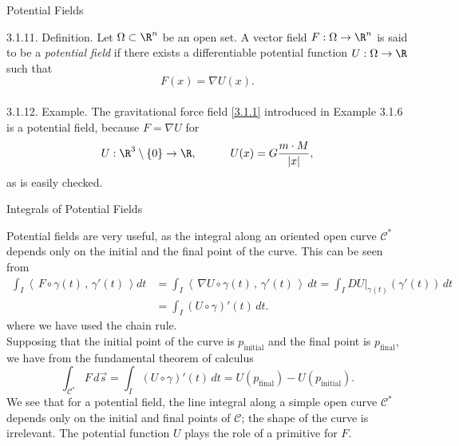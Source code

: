 \documentclass[smaller,hyperref={CJKbookmarks=true}]{beamer}
\newcommand{\scp}[2]{\left\langle\,#1\,,\,#2\,\right\rangle} \newcommand{\scpp}{\langle\,\cdot\,,\,\cdot\,\rangle}
\begin{document}
\begin{frame}[c]{Potential Fields}
\begin{spacing}{1.05}
\alert{3.1.11. Definition.} Let $\Omega\subset\R^n$ be an open set. A vector field $F:\Omega\to\R^n$ is said to be a \emph{potential field} if there exists a dif{}ferentiable potential
function $U:\Omega\to\R$ such that
\[F(x)=\nabla U(x).\]
 \\[12pt]
\alert{3.1.12. Example.} The gravitational force field \eqref{3.1.1} introduced in Example 3.1.6 is a potential field, because $F=\nabla U$ for
\begin{equation}\label{3.1.7}
  U:\R^3\setminus\{0\}\to\R,\qquad\quad
  U(x)=G\frac{m\cdot M}{|x|},
\end{equation}
as is easily checked.
\end{spacing}
\end{frame}
\begin{frame}[t]{Integrals of Potential Fields}
\begin{spacing}{0.95}
Potential fields are very useful, as the integral along an oriented open
curve $\mathcal{C}^*$ depends only on the initial and the final point of the curve. This
can be seen from
\begin{equation*}
  \begin{split}
     \int_I\scp{F\circ\gamma(t)}{\gamma'(t)}dt &=\int_I\scp{\nabla U\circ\gamma(t)}{\gamma'(t)}\,dt
     =\int_I DU|_{\gamma(t)}(\gamma'(t))\,dt \\
       &=\int_I(U\circ\gamma)'(t)\,dt.
  \end{split}
\end{equation*}
where we have used the chain rule.\\[5pt]
Supposing that the initial point of the curve is $p_{\text{initial}}$ and the final point is $p_{\text{final}}$, we have from the fundamental theorem of calculus
\[\int_{\mathcal{C}^*}F\,d\vec{s}=
\int_I(U\circ\gamma)'(t)\,dt=
U(p_{\text{final}})-U(p_{\text{initial}}).\]
We see that for a potential field, the line integral along a simple open curve $\mathcal{C}^*$ depends only on the initial and final points of $\mathcal{C}$; the shape of the curve
is irrelevant. The potential function $U$ plays the role of a primitive for $F$.
\end{spacing}
\end{frame}
\end{document}
